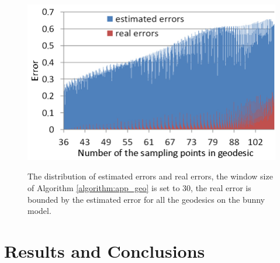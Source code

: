 \begin{figure}[H]
	\centering	
	\includegraphics[width=0.9\columnwidth]{../images/geodesic_image/figure7b}\\
    \caption[The distribution of estimated errors and real errors]{The distribution of estimated errors and real errors, the window size of Algorithm \ref{algorithm:app_geo} is set to 30, the real error is bounded by the estimated error for all the geodesics on the bunny model.}
    \label{figure:geo_app_error4}
\end{figure}


%




 

\section{Results and Conclusions}

